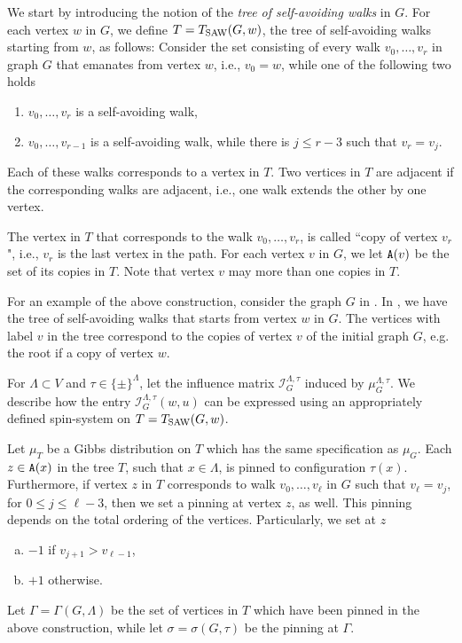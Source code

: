 \documentclass[11pt,reqno]{amsart}
\numberwithin{equation}{section}
\newcommand{\cI}{{\mathcal{I}}}
\newcommand{\applegreen}[1]{ {\color{applegreen}#1}}
\newcommand{\blue}[1]{{\color{blue}#1}}
\newcommand{\bostonuniversityred}[1]{{\color{bostonuniversityred}#1}}
\newcommand{\cadmiumgreen}[1]{{\color{cadmiumgreen}#1}}
\newcommand{\coquelicot}[1]{{\color{coquelicot}#1}}
\newcommand{\electricviolet}[1]{{\color{electricviolet}#1}}
\newcommand{\heliotrope}[1]{{\color{heliotrope}#1}}
\newcommand{\red}[1]{{\color{red}#1}}
\newcommand{\Tsaw}{T_{\rm SAW}}
\newcommand{\cp}{{\tt A}}
\newcommand{\infmatrix}{\cI}
\renewcommand{\applegreen}[1]{#1}
\renewcommand{\blue}[1]{#1}
\renewcommand{\bostonuniversityred}[1]{#1}
\renewcommand{\cadmiumgreen}[1]{#1}
\renewcommand{\coquelicot}[1]{#1}
\renewcommand{\electricviolet}[1]{#1}
\renewcommand{\heliotrope}[1]{#1}
\renewcommand{\red}[1]{#1}
\newcommand{\kj}{\coquelicot{j}}
\newcommand{\kell}{{\color{green(pigment)}\ell}}%
\newcommand{\kr}{\bostonuniversityred{r}}%
\newcommand{\ku}{\red{u}}
\newcommand{\kv}{\electricviolet{v}}
\newcommand{\kw}{\blue{w}}
\newcommand{\kx}{\heliotrope{x}}
\newcommand{\kz}{\cadmiumgreen{z}}
\renewcommand{\kj}{j}
\renewcommand{\kell}{\ell}
\renewcommand{\kr}{r}
\renewcommand{\ku}{u}
\renewcommand{\kv}{v}
\renewcommand{\kw}{w}
\renewcommand{\kx}{x}
\renewcommand{\kz}{z}
\begin{document}
We start by introducing the notion of the {\em tree of self-avoiding walks} in $G$. 
% 
For each vertex $\kw$ in $G$, we define $T=\Tsaw(G,\kw)$, the tree of self-avoiding walks 
starting from $\kw$, as follows:
%
Consider the set consisting of every walk $\kv_0, \ldots, \kv_{\kr}$ in graph $G$ that emanates 
from vertex $\kw$, i.e., $\kv_0=\kw$, while one of the following two holds
\begin{enumerate}
\item $\kv_0, \ldots, \kv_{\kr}$ is a self-avoiding walk,
\item $\kv_0, \ldots, \kv_{\kr-1}$ is a self-avoiding walk, while there is $j\leq \kr-3$ such that $\kv_{\kr}=\kv_{j}$.
\end{enumerate}
%
Each of these walks  corresponds to a vertex in $T$. Two vertices in $T$ are adjacent 
if the corresponding walks are adjacent, i.e.,  one walk extends the other by one vertex.
 


The vertex in $T$ that corresponds to the walk $\kv_0, \ldots, \kv_{\kr}$, 
is called  ``copy of vertex $\kv_{\kr}$", i.e., $\kv_{\kr}$ is the last vertex in the path. 
% 
For each vertex $\kv$ in $G$, we let $\cp(\kv)$ be the set of its copies in $T$. 
Note that vertex $\kv$ may more than one  copies in $T$. 

For an example of the above construction, consider the graph $G$ in .
In , we have the tree of self-avoiding walks that starts from vertex $\kw$ in $G$.
The vertices with label $\kv$ in the tree  correspond to the copies of  vertex $\kv$ of the initial 
graph $G$, e.g. the root if a copy of vertex $\kw$.




For $\Lambda\subset V$ and $\tau\in \{\pm \}^{\Lambda}$, let 
the influence matrix $\infmatrix^{\Lambda,\tau}_{G}$ induced by $\mu^{\Lambda,\tau}_G$. 
%
We describe how the entry 
$\infmatrix^{\Lambda,\tau}_{G}(\kw,\ku)$ can be expressed using an appropriately defined 
spin-system on $T=\Tsaw(G,\kw)$. 



Let $\mu_T$ be a Gibbs distribution on $T$ which has the same specification as $\mu_G$.
%
Each $\kz \in \cp(\kx)$ in the tree $T$, such 
that $\kx \in \Lambda$, is pinned to   configuration  $\tau(\kx)$. Furthermore, if  
 vertex $\kz$ in $T$  corresponds  to walk  $\kv_0, \ldots, \kv_{\kell}$ in $G$ such that 
$\kv_{\kell}=\kv_j$, for $0\leq j \leq \kell-3$, then  we set a pinning at vertex $\kz$, as well. This pinning 
depends on the  total ordering of the vertices. Particularly, we set at $\kz$
\begin{enumerate}[(a)]	
\item $-1$ if $\kv_{\kj+1}>\kv_{\kell-1}$, 
\item $+1$ otherwise.
\end{enumerate}
Let $\Gamma=\Gamma(G,\Lambda)$ be the set of vertices in $T$ which have been pinned 
in the above construction, while let $\sigma=\sigma(G,\tau)$ be the pinning  at $\Gamma$.
\end{document}
